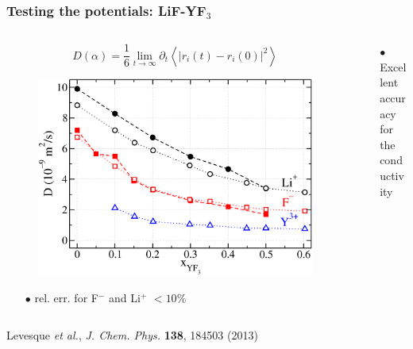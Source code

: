 \documentclass{beamer}
\begin{document}
\begin{frame}
   \frametitle{Testing the potentials: LiF-YF$_3$}
   \begin{columns}
      \begin{column}{6cm}
        \begin{equation}
            D(\alpha)=\frac{1}{6}\lim_{t\rightarrow\infty}\partial_t \left< \left| r_i(t)-r_i(0) \right|^2 \right> \nonumber
        \end{equation}
                \begin{figure}
                    \includegraphics[width=\textwidth]{LiFYF3diffusion}
                \end{figure}
\vspace{-0.5cm}
        \begin{itemize}
           \item[$\bullet$] rel. err. for F$^-$ and Li$^+$ $<10\%$
        \end{itemize}
      \end{column}
      \begin{column}{6cm}
        \begin{itemize}
           \item[$\bullet$] Excellent accuracy \\ for the conductivity
        \end{itemize}
      \end{column}
   \end{columns}

{\scriptsize   Levesque {\it et al.}, {\it J. Chem. Phys.} {\bf 138}, 184503 (2013)}
\end{frame}
\end{document}
